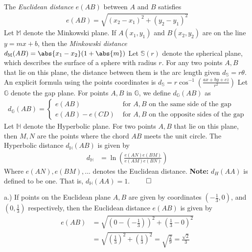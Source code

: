 \documentclass{report}
\begin{document}
    \bigbreak \noindent 
    \begin{remark}
        The \textit{Euclidean distance} $e(AB)$ between $A$ and $B$ satisfies 
        \begin{align*}
            e(AB) = \sqrt{(x_{2} - x_{1})^{2} + (y_{2} - y_{1})^{2}}
        \end{align*}
        Let $\mathbb{M}$ denote the Minkowski plane. If $A(x_{1}, y_{1})$ and $B(x_{2}, y_{2}) $ are on the line $y=mx+b$, then the \textit{Minkowski distance} $d_{\mathbb{M}}(AB) = \abs{x_{1} - x_{2}}(1+\abs{m})$
        \bigbreak \noindent 
        Let $\mathbb{S}(r)$ denote the spherical plane, which describes the surface of a sphere with radius $r$. For any two points $A,B$ that lie on this plane, the distance between them is the arc length given $d_{\mathbb{S}} = r\theta$. An explicit formula using the points coordinates is $d_{\mathbb{S}} = r\cos^{-1}{\left(\frac{ax+by+cz}{r^{2}}\right)}$
        \bigbreak \noindent 
        Let $\mathbb{G}$ denote the gap plane. For points $A,B$ in $\mathbb{G}$, we define $d_{\mathbb{G}}(AB)$ as
        \begin{align*}
            d_{\mathbb{G}}(AB) = \begin{cases}
                e(AB) & \text{ for $A,B$ on the same side of the gap} \\     
                e(AB) - e(CD) & \text{ for $A,B$ on the opposite sides of the gap} 
            \end{cases}
        \end{align*}
        Let $\mathbb{H}$ denote the Hyperbolic plane. For two points $A,B$ that lie on this plane, then $M,N$ are the points where the chord $AB $ meets the unit circle. The Hyperbolic distance $d_{\mathbb{H}}(AB)$ is given by
        \begin{align*}
            d_{\mathbb{H}} &= \ln{\left(\frac{e(AN)e(BM)}{e(AM)e(BN)}\right)}
        \end{align*}
        Where $e(AN),e(BM),...$ denotes the Euclidean distance.
        \bigbreak \noindent 
        \textbf{Note:} $d_{H}(AA)$ is defined to be one. That is, $d_{\mathbb{H}}(AA) = 1$.
        \bigbreak \noindent 
        $\qed$
    \end{remark}
    \bigbreak \noindent 
    a.) If points on the Euclidean plane $A,B$ are given by coordinates $\left(-\frac{1}{3},0\right)$, and $\left(0,\frac{1}{3}\right) $ respectively, then the Euclidean distance $e(AB)$ is given by
    \begin{align*}
        e(AB) &= \sqrt{\left(0-\left(-\frac{1}{3}\right)\right)^{2} + \left(\frac{1}{3}-0\right)^{2}} \\
              &= \sqrt{\left(\frac{1}{3}\right)^{2} + \left(\frac{1}{3}\right)^{2}} = \sqrt{\frac{2}{9}} = \frac{\sqrt{2}}{3}
    \end{align*}
\end{document}
